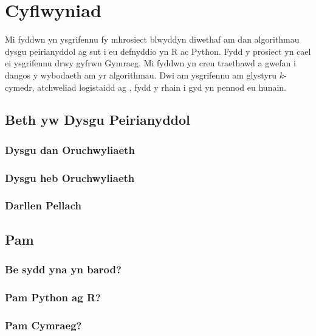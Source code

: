 \chapter{Cyflwyniad}\label{cha:introduction}

Mi fyddwn yn ysgrifennu fy mhrosiect blwyddyn diwethaf am dan algorithmau dysgu peirianyddol ag sut i eu defnyddio yn R ac Python. Fydd y prosiect yn cael ei ysgrifennu drwy gyfrwn Gymraeg. Mi fyddwn yn creu traethawd a gwefan i dangos y wybodaeth am yr algorithmau. Dwi am ysgrifennu am glystyru $k$-cymedr, atchweliad logistaidd ag , fydd y rhain i gyd yn pennod eu hunain.    

\section{Beth yw Dysgu Peirianyddol}\label{sec:intro_pd}
\subsection{Dysgu dan Oruchwyliaeth}


\subsection{Dysgu heb Oruchwyliaeth}


\subsection{Darllen Pellach}

\section{Pam}

\subsection{Be sydd yna yn barod?}

\subsection{Pam Python ag R?}

\subsection{Pam Cymraeg?}


